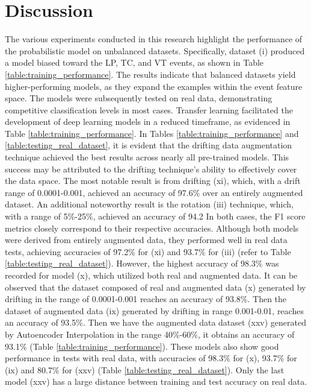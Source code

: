 \documentclass[journal]{IEEEtran}
\begin{document}
\section{Discussion} \label{discussion}
The various experiments conducted in this research highlight the performance of the probabilistic model on unbalanced datasets. Specifically, dataset (i) produced a model biased toward the LP, TC, and VT events, as shown in Table \ref{table:training_performance}.
The results indicate that balanced datasets yield higher-performing models, as they expand the examples within the event feature space. The models were subsequently tested on real data, demonstrating competitive classification levels in most cases. Transfer learning facilitated the development of deep learning models in a reduced timeframe, as evidenced in Table \ref{table:training_performance}.
In Tables \ref{table:training_performance} and \ref{table:testing_real_dataset}, it is evident that the drifting data augmentation technique achieved the best results across nearly all pre-trained models. This success may be attributed to the drifting technique's ability to effectively cover the data space. The most notable result is from drifting (xi), which, with a drift range of 0.0001-0.001, achieved an accuracy of 97.6\% over an entirely augmented dataset. An additional noteworthy result is the rotation (iii) technique, which, with a range of 5\%-25\%, achieved an accuracy of 94.2%
In both cases, the F1 score metrics closely correspond to their respective accuracies. Although both models were derived from entirely augmented data, they performed well in real data tests, achieving accuracies of 97.2\% for (xi) and 93.7\% for (iii) (refer to Table \ref{table:testing_real_dataset}). However, the highest accuracy of 98.3\% was recorded for model (x), which utilized both real and augmented data.
It can be observed that the dataset composed of real and augmented data (x) generated by drifting in the range of 0.0001-0.001 reaches an accuracy of 93.8\%. Then the dataset of augmented data (ix) generated by drifting in range 0.001-0.01, reaches an accuracy of 93.5\%. Then we have the augmented data dataset (xxv) generated by Autoencoder Interpolation in the range 40\%-60\%, it obtains an accuracy of 93.1\% (Table \ref{table:training_performance}). These models also show good performance in tests with real data, with accuracies of 98.3\% for (x), 93.7\% for (ix) and 80.7\% for (xxv) (Table \ref{table:testing_real_dataset}). Only the last model (xxv) has a large distance between training and test accuracy on real data.
\end{document}
